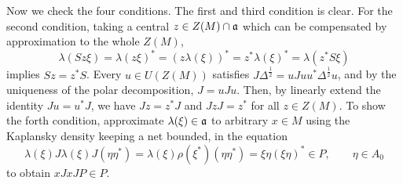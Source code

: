 \documentclass{../../large}
\begin{document}
\begin{pf}
Now we check the four conditions.
The first and third condition is clear.
For the second condition, taking a central $z\in Z(M)\cap\mathfrak{a}$ which can be compensated by approximation to the whole $Z(M)$,
\[\lambda(Sz\xi)=\lambda(z\xi)^*=(z\lambda(\xi))^*=z^*\lambda(\xi)^*=\lambda(z^*S\xi)\]
implies $Sz=z^*S$.
Every $u\in U(Z(M))$ satisfies $J\Delta^{\frac12}=uJuu^*\Delta^{\frac12}u$, and by the uniqueness of the polar decomposition, $J=uJu$.
Then, by linearly extend the identity $Ju=u^*J$, we have $Jz=z^*J$ and $JzJ=z^*$ for all $z\in Z(M)$.
To show the forth condition, approximate $\lambda(\xi)\in\mathfrak{a}$ to arbitrary $x\in M$ using the Kaplansky density keeping a net bounded, in the equation
\[\lambda(\xi)J\lambda(\xi)J(\eta\eta^*)=\lambda(\xi)\rho(\xi^*)(\eta\eta^*)=\xi\eta(\xi\eta)^*\in P,\qquad\eta\in A_0\]
to obtain $xJxJP\in P$.
\end{pf}
\end{document}
